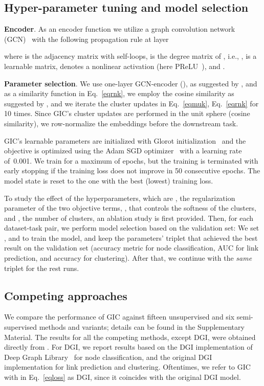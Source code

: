 \documentclass{article}
\begin{document}
\subsection{Hyper-parameter tuning and model selection}
\textbf{Encoder}. As an encoder function  we utilize a graph convolution network (GCN)~\cite{kipf2016semi} with the following propagation rule at layer 

where  is the adjacency matrix with self-loops,  is the degree matrix of , i.e., ,   is a learnable matrix,  denotes a nonlinear activation (here PReLU~\cite{he2015delving}), and .

\noindent
\textbf{Parameter selection}. We use one-layer GCN-encoder (), as suggested by \cite{velickovic2018deep}, and as a similarity function in Eq.~\eqref{eqrnk}, we employ the cosine similarity as suggested by \cite{wilder2019end}, and we iterate the cluster updates in Eq.~\eqref{eqmuk}, Eq.~\eqref{eqrnk} for 10 times. Since GIC's cluster updates are performed in the unit sphere (cosine similarity), we row-normalize the embeddings before the downstream task.

GIC's learnable parameters are initialized with Glorot initialization~\cite{glorot10a} and the objective is optimized using the Adam SGD optimizer~\cite{kingma2014adam} with a learning rate  of~0.001. We train for a maximum of  epochs, but the training is terminated with early stopping if the training loss does not improve in 50 consecutive epochs. The model state is reset to the one with the best (lowest) training loss.

To study the effect of the hyperparameters, which are , the regularization parameter of the two objective terms, , that controls the softness of the clusters, and , the number of clusters, an ablation study is first provided. Then, for each dataset-task pair, we perform model selection based on the validation set: We set ,  and  to train the model, and keep the parameters' triplet that achieved the best result on the validation set (accuracy metric for node classification, AUC for link prediction, and accuracy for clustering). After that, we continue with the \emph{same} triplet for the rest runs.

\subsection{Competing approaches}
We compare the performance of GIC against fifteen unsupervised and six semi-supervised methods and variants; details can be found in the Supplementary Material.  The results for all the competing methods, except DGI, were obtained directly from \cite{shchur2018pitfalls,pan2019learning}. For DGI, we report results based on the DGI implementation of Deep Graph Library~\cite{wang2019dgl} for node classification, and the original DGI implementation for link prediction and clustering. Oftentimes, we refer to GIC with  in Eq.~\eqref{eqloss} as DGI, since it coincides with the original DGI model.
\end{document}
